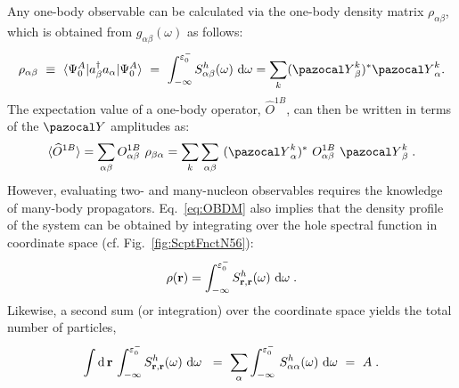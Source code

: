 Any one-body observable can be calculated via the one-body density matrix $\rho_{\alpha\beta}$, which is obtained from $g_{\alpha\beta}(\omega)$ as follows:
\begin{equation}
 \rho_{\alpha \beta} ~\equiv ~ \langle\Psi_0^A\vert a^{\dag}_{\beta}a_{\alpha} \vert\Psi_0^A\rangle
  ~=~  \int_{-\infty}^{\varepsilon^-_0}S^h_{\alpha\beta}(\omega)~{\rm d}\omega=\sum_k ({\pazocal Y}^k_{\beta})^*{\pazocal Y}^k_{\alpha} .
 \label{eq:OBDM}
\end{equation}
The expectation value of a one-body operator, ${\widehat O}^{1B}$, can then be written in terms of the ${\pazocal Y}$ amplitudes as:
\begin{equation}
\label{eq:den_one}
\langle {\widehat O}^{1B}\rangle  =\sum_{\alpha\beta}  O^{1B}_{\alpha \beta}\,\,\rho_{\beta\alpha}=\sum_k \sum_{\alpha\beta}~ ({\pazocal Y}^k_{\alpha})^*~ O^{1B}_{\alpha\beta} ~  {\pazocal Y}^k_{\beta} \; .
\end{equation}
However, evaluating two- and many-nucleon observables requires the knowledge of many-body propagators. 
%
Eq.~\eqref{eq:OBDM} also implies that the density profile of the system can be obtained by integrating over the hole  spectral function in coordinate space (cf. Fig.~\ref{fig:ScptFnctN56}):
\begin{equation}
  \label{eq:rho_r}
   \rho({\bf r})  =  \int_{-\infty}^{\varepsilon^-_0}S^h_{{\bf r},{\bf r}}(\omega)~{\rm d}\omega \; .
\end{equation}
Likewise, a second sum (or integration) over the coordinate space yields the total number of particles,
\begin{equation}
  \int {\rm d}\,{\bf r} \,  \int_{-\infty}^{\varepsilon^-_0} S^h_{{\bf r},{\bf r}}(\omega)~{\rm d}\omega \;  ~=~
   \sum_\alpha \int_{-\infty}^{\varepsilon^-_0} \, S^h_{\alpha\alpha}(\omega)~{\rm d}\omega ~=~ A \; .
   \label{eq:part_num}
\end{equation}


